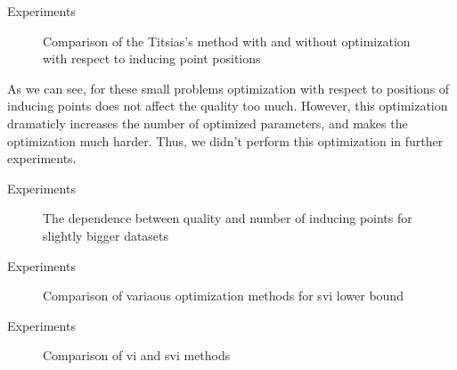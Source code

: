 \begin{frame}{Experiments}
	\begin{figure}[!h]
		\centering
		\subfloat{
			\scalebox{0.4}{
				
			}
		}
		\subfloat{
			\scalebox{0.4}{
				
			}
		}
		\caption{Comparison of the Titsias's method with and without optimization with respect to inducing point positions}
	\end{figure}
	As we can see, for these small problems optimization with respect to positions of inducing points does not affect the quality too much. However, this optimization dramaticly increases the number of optimized parameters, and makes the optimization much harder. Thus, we didn't perform this optimization in further experiments.
\end{frame}

\begin{frame}{Experiments}
	\begin{figure}[!h]
		\centering
		\subfloat{
			\scalebox{0.4}{
				
			}
		}
		\subfloat{
			\scalebox{0.4}{
				
			}
		}
		\caption{The dependence between quality and number of inducing points for slightly bigger datasets}
	\end{figure}
\end{frame}

\begin{frame}{Experiments}
	\begin{figure}[!h]
		\centering
		\subfloat{
			\scalebox{0.4}{
				
			}
		}
		\subfloat{
			\scalebox{0.4}{
				
			}
		}
		\caption{Comparison of variaous optimization methods for svi lower bound}
	\end{figure}
\end{frame}

\begin{frame}{Experiments}
	\begin{figure}[!h]
		\centering
		\subfloat{
			\scalebox{0.4}{
				
			}
		}
		\subfloat{
			\scalebox{0.4}{
				
			}
		}
		\caption{Comparison of vi and svi methods}
	\end{figure}
\end{frame}